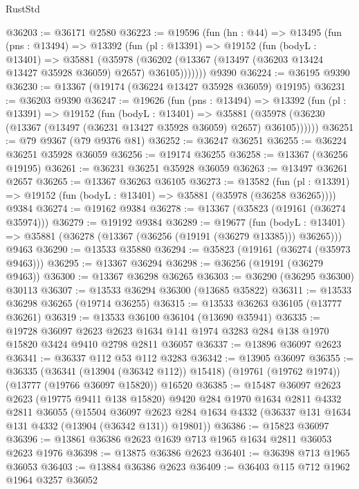 \begin{lexlean}{RustStd}
\begin{coremodule}
@36203 := @36171 @2580
@36223 := @19596
    (fun (hn : @44) =>
    @13495
      (fun (pns : @13494) =>
      @13392
        (fun (pl : @13391) =>
        @19152
          (fun (bodyL : @13401) =>
          @35881
            (@35978
              (@36202 (@13367 (@13497 (@36203 @13424 @13427 @35928 @36059) @2657) @36105)))))))
    @9390
@36224 := @36195 @9390
@36230 := @13367 (@19174 (@36224 @13427 @35928 @36059) @19195)
@36231 := @36203 @9390
@36247 := @19626
    (fun (pns : @13494) =>
    @13392
      (fun (pl : @13391) =>
      @19152
        (fun (bodyL : @13401) =>
        @35881 (@35978 (@36230 (@13367 (@13497 (@36231 @13427 @35928 @36059) @2657) @36105))))))
@36251 := @79 @9367 (@79 @9376 @81)
@36252 := @36247 @36251
@36255 := @36224 @36251 @35928 @36059
@36256 := @19174 @36255
@36258 := @13367 (@36256 @19195)
@36261 := @36231 @36251 @35928 @36059
@36263 := @13497 @36261 @2657
@36265 := @13367 @36263 @36105
@36273 := @13582
    (fun (pl : @13391) => @19152 (fun (bodyL : @13401) => @35881 (@35978 (@36258 @36265))))
    @9384
@36274 := @19162 @9384
@36278 := @13367 (@35823 (@19161 (@36274 @35974)))
@36279 := @19192 @9384
@36289 := @19677
    (fun (bodyL : @13401) => @35881 (@36278 (@13367 (@36256 (@19191 (@36279 @13385))) @36265)))
    @9463
@36290 := @13533 @35880
@36294 := @35823 (@19161 (@36274 (@35973 @9463)))
@36295 := @13367 @36294
@36298 := @36256 (@19191 (@36279 @9463))
@36300 := @13367 @36298 @36265
@36303 := @36290 (@36295 @36300) @30113
@36307 := @13533 @36294 @36300 (@13685 @35822)
@36311 := @13533 @36298 @36265 (@19714 @36255)
@36315 := @13533 @36263 @36105 (@13777 @36261)
@36319 := @13533 @36100 @36104 (@13690 @35941)
@36335 := @19728
    @36097
    @2623
    @2623
    @1634
    @141
    @1974
    @3283
    @284
    @138
    @1970
    @15820
    @3424
    @9410
    @2798
    @2811
    @36057
@36337 := @13896 @36097 @2623
@36341 := @36337 @112 @53 @112 @3283
@36342 := @13905 @36097
@36355 := @36335
    (@36341 (@13904 (@36342 @112)) @15418)
    (@19761 (@19762 @1974))
    (@13777 (@19766 @36097 @15820))
    @16520
@36385 := @15487
    @36097
    @2623
    @2623
    (@19775 @9411 @138 @15820)
    @9420
    @284
    @1970
    @1634
    @2811
    @4332
    @2811
    @36055
    (@15504
      @36097
      @2623
      @284
      @1634
      @4332
      (@36337 @131 @1634 @131 @4332 (@13904 (@36342 @131)) @19801))
@36386 := @15823 @36097
@36396 := @13861 @36386 @2623 @1639 @713 @1965 @1634 @2811 @36053 @2623 @1976
@36398 := @13875 @36386 @2623
@36401 := @36398 @713 @1965 @36053
@36403 := @13884 @36386 @2623
@36409 := @36403 @115 @712 @1962 @1964 @3257 @36052

\end{coremodule}
\end{lexlean}
